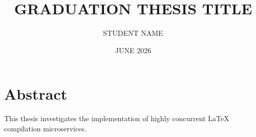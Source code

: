 \documentclass{bdc-thesis}
\title{GRADUATION THESIS TITLE}
\author{STUDENT NAME}
\date{JUNE 2026}
\begin{document}
\maketitle

\chapter*{Abstract}
This thesis investigates the implementation of highly concurrent LaTeX compilation microservices.

\tableofcontents





\end{document}
